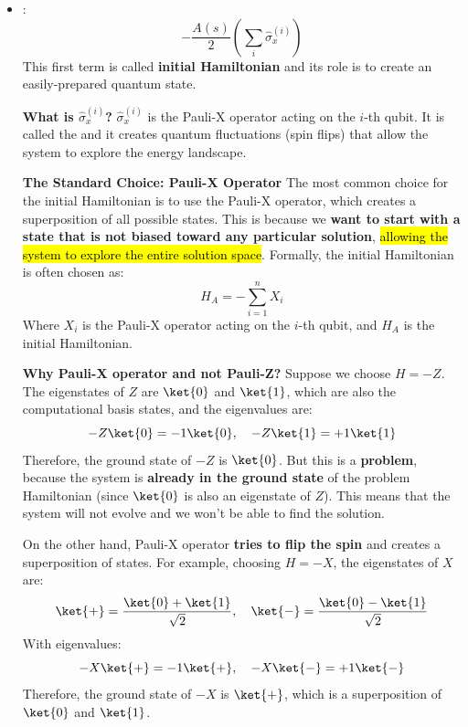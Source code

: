 \begin{itemize}
    \item {}:
    \begin{equation*}
        -\frac{A(s)}{2} \left( \sum_i \hat{\sigma}_{x}^{(i)} \right)
    \end{equation*}
    This first term is called \textbf{initial Hamiltonian} and its role is to create an easily-prepared quantum state.

    \textcolor{Green3}{ \textbf{What is $\hat{\sigma}_{x}^{(i)}$?}} $\hat{\sigma}_{x}^{(i)}$ is the Pauli-X operator acting on the $i$-th qubit. It is called the  and it creates quantum fluctuations (spin flips) that allow the system to explore the energy landscape.

    \textcolor{Green3}{ \textbf{The Standard Choice: Pauli-X Operator}} The most common choice for the initial Hamiltonian is to use the Pauli-X operator, which creates a superposition of all possible states. This is because we \textbf{want to start with a state that is not biased toward any particular solution}, \hl{allowing the system to explore the entire solution space}. Formally, the initial Hamiltonian is often chosen as:
    \begin{equation}\label{eq:initial-hamiltonian}
        H_A = -\sum_{i=1}^n X_i
    \end{equation}
    Where $X_i$ is the Pauli-X operator acting on the $i$-th qubit, and $H_A$ is the initial Hamiltonian.

    \textcolor{Green3}{ \textbf{Why Pauli-X operator and not Pauli-Z?}} Suppose we choose $H = -Z$. The eigenstates of $Z$ are $\ket{0}$ and $\ket{1}$, which are also the computational basis states, and the eigenvalues are:
    \begin{equation*}
        -Z\ket{0} = -1 \ket{0}, \quad -Z\ket{1} = +1 \ket{1}
    \end{equation*}
    Therefore, the ground state of $-Z$ is $\ket{0}$. But this is a \textbf{problem}, because the system is \textbf{already in the ground state} of the problem Hamiltonian (since $\ket{0}$ is also an eigenstate of $Z$). This means that the system will not evolve and we won't be able to find the solution.

    \highspace
    On the other hand, Pauli-X operator \textbf{tries to flip the spin} and creates a superposition of states. For example, choosing $H = -X$, the eigenstates of $X$ are:
    \begin{equation*}
        \ket{+} = \frac{\ket{0} + \ket{1}}{\sqrt{2}}, \quad \ket{-} = \frac{\ket{0} - \ket{1}}{\sqrt{2}}
    \end{equation*}
    With eigenvalues:
    \begin{equation*}
        -X\ket{+} = -1 \ket{+}, \quad -X\ket{-} = +1 \ket{-}
    \end{equation*}
    Therefore, the ground state of $-X$ is $\ket{+}$, which is a superposition of $\ket{0}$ and $\ket{1}$.


\end{itemize}
